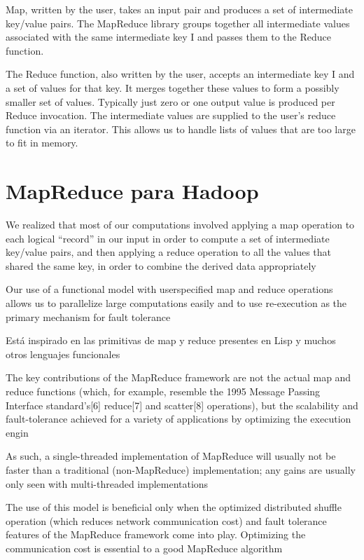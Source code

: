 \documentclass[conference]{IEEEtran}
\begin{document}
Map, written by the user, takes an input pair and produces
a set of intermediate key/value pairs. The MapReduce
library groups together all intermediate values associated
with the same intermediate key I and passes them
to the Reduce function.


The Reduce function, also written by the user, accepts
an intermediate key I and a set of values for that key. It
merges together these values to form a possibly smaller
set of values. Typically just zero or one output value is
produced per Reduce invocation. The intermediate values
are supplied to the user’s reduce function via an iterator.
This allows us to handle lists of values that are too
large to fit in memory.

\section{MapReduce para Hadoop}

We realized that
most of our computations involved applying a map operation
to each logical “record” in our input in order to
compute a set of intermediate key/value pairs, and then
applying a reduce operation to all the values that shared
the same key, in order to combine the derived data appropriately


Our use of a functional model with userspecified
map and reduce operations allows us to parallelize
large computations easily and to use re-execution
as the primary mechanism for fault tolerance

Está inspirado en las primitivas de map y reduce presentes en Lisp y muchos otros lenguajes funcionales





The key contributions of the MapReduce framework are not the actual map and reduce functions (which, for example, resemble the 1995 Message Passing Interface standard's[6] reduce[7] and scatter[8] operations), but the scalability and fault-tolerance achieved for a variety of applications by optimizing the execution engin

As such, a single-threaded implementation of MapReduce will usually not be faster than a traditional (non-MapReduce) implementation; any gains are usually only seen with multi-threaded implementations


The use of this model is beneficial only when the optimized distributed shuffle operation (which reduces network communication cost) and fault tolerance features of the MapReduce framework come into play. Optimizing the communication cost is essential to a good MapReduce algorithm
\end{document}
